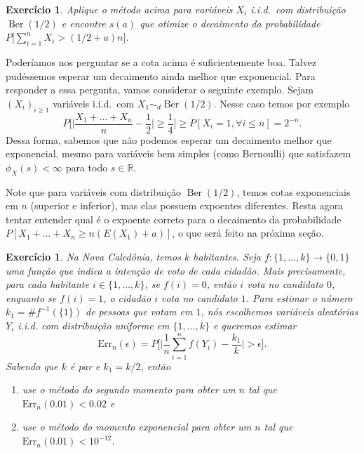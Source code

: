 \documentclass[reqno, final]{book}
\newcommand*\1{\mathds{1}}
\newtheorem{exercise}[example]{Exercício}
\DeclareMathOperator{\Ber}{Ber}
\def \iid{i.i.d.~}
\def \distr{\sim_d}
\begin{document}
\begin{exercise}
  Aplique o método acima para variáveis $X_i$ \iid com distribuição $\Ber(1/2)$ e encontre $s(a)$ que otimize o decaimento da probabilidade $P\big[\sum_{i=1}^n X_i > (1/2 + a) n \big]$.
\end{exercise}

Poderíamos nos perguntar se a cota acima é suficientemente boa.
Talvez pudéssemos esperar um decaimento ainda melhor que exponencial.
Para responder a essa pergunta, vamos considerar o seguinte exemplo.
Sejam $(X_i)_{i \geq 1}$ variáveis \iid com $X_1 \distr \Ber(1/2)$.
Nesse caso temos por exemplo
\begin{equation}
  P\Big[ \big| \frac{X_1 + \dots + X_n}{n} - \frac 12 \big| \geq \frac 14\Big] \geq P[X_i = 1, \forall i \leq n] = 2^{-n}.
\end{equation}
Dessa forma, sabemos que não podemos esperar um decaimento melhor que exponencial, mesmo para variáveis bem simples (como Bernoulli) que satisfazem $\phi_X(s) < \infty$ para todo $s \in \mathbb{R}$.

Note que para variáveis com distribuição $\Ber(1/2)$, temos cotas exponenciais em $n$ (superior e inferior), mas elas possuem expoentes diferentes.
Resta agora tentar entender qual é o expoente correto para o decaimento da probabilidade $P[X_1 + \dots + X_n \geq n(E(X_1) + a)]$, o que será feito na próxima seção.

\begin{exercise}
  Na Nova Caledônia, temos $k$ habitantes.
  Seja $f:\{1, \dots, k\} \to \{0,1\}$ uma função que indica a intenção de voto de cada cidadão.
  Mais precisamente, para cada habitante $i \in \{1, \dots, k\}$, se $f(i) = 0$, então $i$ vota no candidato $0$, enquanto se $f(i) = 1$, o cidadão $i$ vota no candidato $1$.
  Para estimar o número $k_1 = \# f^{-1}(\{1\})$ de pessoas que votam em $1$, nós escolhemos variáveis aleatórias $Y_i$ i.i.d. com distribuição uniforme em $\{1, \dots, k\}$ e queremos estimar
  \begin{equation}
    \text{Err}_n(\epsilon) = P \Big[ \Big| \frac{1}{n} \sum_{i=1}^n f(Y_i) - \frac{k_1}{k} \Big| > \epsilon \Big].
  \end{equation}
  Sabendo que $k$ é par e $k_1 = k/2$, então
  \begin{enumerate}[\quad a)]
  \item use o método do segundo momento para obter um $n$ tal que $\text{Err}_{n}(0.01) < 0.02$ e
  \item use o método do momento exponencial para obter um $n$ tal que $\text{Err}_{n}(0.01) < 10^{-12}$.
  \end{enumerate}
\end{exercise}
\end{document}
